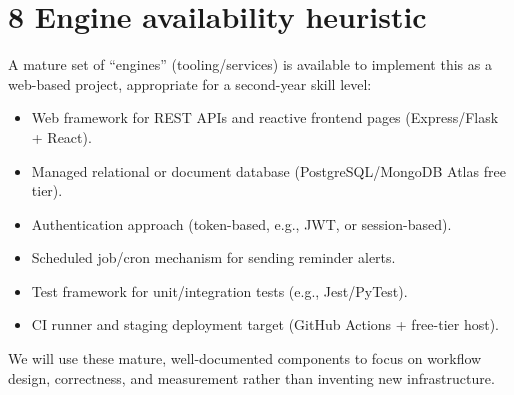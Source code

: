 \documentclass[11pt,a4paper]{article}
\begin{document}
\section*{8 Engine availability heuristic}
A mature set of ``engines'' (tooling/services) is available to implement this as
a web-based project, appropriate for a second-year skill level:
\begin{itemize}[leftmargin=1.5em]
  \item Web framework for REST APIs and reactive frontend pages (Express/Flask
  + React).
  \item Managed relational or document database (PostgreSQL/MongoDB Atlas free
  tier).
  \item Authentication approach (token-based, e.g., JWT, or session-based).
  \item Scheduled job/cron mechanism for sending reminder alerts.
  \item Test framework for unit/integration tests (e.g., Jest/PyTest).
  \item CI runner and staging deployment target (GitHub Actions + free-tier
  host).
\end{itemize}
We will use these mature, well-documented components to focus on workflow
design, correctness, and measurement rather than inventing new infrastructure.
\end{document}
